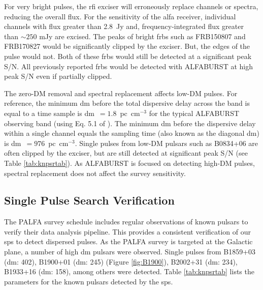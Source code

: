 \documentclass[a4paper,fleqn,usenatbib]{mnras}
\begin{document}
For very bright pulses, the \gls{rfi} exciser will erroneously replace channels or spectra,
reducing the overall flux.  For the sensitivity of the \gls{alfa} receiver,
individual channels with flux greater than 2.8~Jy and, frequency-integrated flux
greater than $\sim250$ mJy are excised. The peaks of bright \glspl{frb} such as
FRB150807 and FRB170827 would be significantly clipped by the exciser. But, the
edges of the pulse would not. Both of these \glspl{frb} would still be detected at a
significant peak S/N. All previously reported \glspl{frb} would be detected with
ALFABURST at high peak S/N even if partially clipped.

The zero-DM removal and spectral replacement affects low-DM pulses. For
reference, the minimum \gls{dm} before the total dispersive delay across the
band is equal to a time sample is \gls{dm}~$=1.8$~pc~cm$^{-3}$ for the
typical ALFABURST observing band (using Eq. 5.1 of \cite{2004hpa..book.....L}).
The minimum \gls{dm} before the dispersive delay within a single channel equals
the sampling time (also known as the diagonal \gls{dm}) is 
\gls{dm}~$=976$~pc~cm$^{-3}$. Single pulses from low-DM pulsars such
as B0834+06 are often clipped by the exciser, but are still detected at
significant peak S/N (see Table \ref{tab:knpsrtab}). As ALFABURST is focused on
detecting high-DM pulses, spectral replacement does not affect the survey
sensitivity.



\subsection{Single Pulse Search Verification}
\label{sec:system_verify}

The PALFA survey schedule includes regular observations of known pulsars to
verify their data analysis pipeline. This provides a consistent verification of
our \gls{sps} to detect dispersed pulses. As the PALFA survey is targeted at the
Galactic plane, a number of high \gls{dm} pulsars were observed. Single pulses
from B1859+03 (\gls{dm}: 402), B1900+01 (\gls{dm}: 245) (Figure
\ref{fig:B1900}), B2002+31 (\gls{dm}: 234), B1933+16 (\gls{dm}: 158), among
others were detected. Table \ref{tab:knpsrtab} lists the parameters for the
known pulsars detected by the \gls{sps}.
\end{document}
